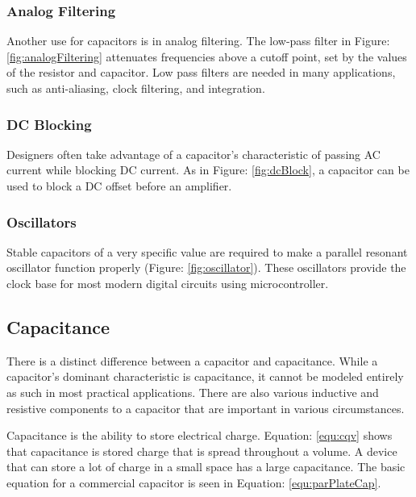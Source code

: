 \subsubsection{Analog Filtering}

Another use for capacitors is in analog filtering. The low-pass filter in Figure: \ref{fig:analogFiltering} attenuates frequencies above a cutoff point, set by the values of the resistor and capacitor. Low pass filters are needed in many applications, such as anti-aliasing, clock filtering, and integration.

\subsubsection{DC Blocking}

Designers often take advantage of a capacitor's characteristic of passing AC current while blocking DC current. As in Figure: \ref{fig:dcBlock}, a capacitor can be used to block a DC offset before an amplifier.

\subsubsection{Oscillators}


Stable capacitors of a very specific value are required to make a parallel resonant oscillator function properly (Figure: \ref{fig:oscillator}). These oscillators provide the clock base for most modern digital circuits using microcontroller.

\subsection{Capacitance}

There is a distinct difference between a capacitor and capacitance. While a capacitor's dominant characteristic is capacitance, it cannot be modeled entirely as such in most practical applications. There are also various inductive and resistive components to a capacitor that are important in various circumstances.


Capacitance is the ability to store electrical charge. Equation: \eqref{equ:cqv} shows that capacitance is stored charge that is spread throughout a volume. A device that can store a lot of charge in a small space has a large capacitance. The basic equation for a commercial capacitor is seen in Equation: \eqref{equ:parPlateCap}.

